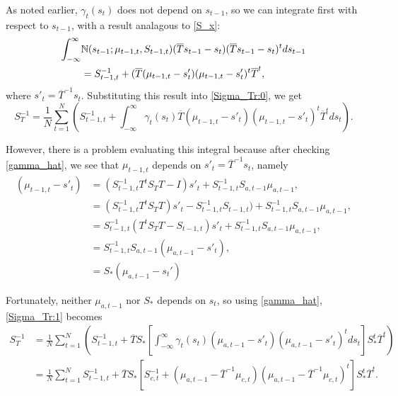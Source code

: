 \documentclass[12pt,leqno]{article}
\begin{document}
As noted earlier, $\gamma_t(s_t)$ does not depend on $s_{t-1}$, so we can integrate first with respect to $s_{t-1}$, with
a result analagous to \eqref{S_x}:
\begin{align*}
  \int_{-\infty}^{\infty}&{\mathbb N}(s_{t-1};\mu_{t-1,t},S_{t-1,t})(\overline{T}s_{t-1}-s_t)
  (\overline{T}s_{t-1}-s_t)^tds_{t-1}\\ &= S_{t-1,t}^{-1} +
(\overline{T}(\mu_{t-1,t}-s'_t)(\mu_{t-1,t}-s'_t)^t\overline{T}^t,
\end{align*}
where $s'_t = \overline{T}^{-1}s_t$.
Substituting this result into \eqref{Sigma_Tr:0}, we get
\begin{equation}\label{Sigma_Tr:1}
  S_T^{-1} =  \frac{1}{N}\sum_{t=1}^N\left(S_{t-1,t}^{-1} +\int_{-\infty}^{\infty}\gamma_t(s_t)
  \overline{T}(\mu_{t-1,t}-s'_t)(\mu_{t-1,t}-s'_t)^t\overline{T}^tds_t\right).
\end{equation}

However, there is a problem evaluating this integral because after checking \eqref{gamma_hat}, we see that $\mu_{t-1,t}$
depends on $s'_t = \overline{T}^{-1}s_t$, namely 
\begin{equation}\label{s-mu_1}
  \begin{split}
    \left(\mu_{t-1,t}-s'_t\right) &= (S_{t-1,t}^{-1}T^{t}S_TT - I)s'_t + S_{t-1,t}^{-1}S_{a,t-1}\mu_{a,t-1}, \\
    &= (S_{t-1,t}^{-1}T^{t}S_TT)s'_t - S_{t-1,t}^{-1}S_{t-1,t}) + S_{t-1,t}^{-1}S_{a,t-1}\mu_{a,t-1}, \\
    &= S_{t-1,t}^{-1}(T^{t}S_TT - S_{t-1,t} )s'_t + S_{t-1,t}^{-1}S_{a,t-1}\mu_{a,t-1}, \\
    &= S_{t-1,t}^{-1}S_{a,t-1}(\mu_{a,t-1}-s'_t),\\
    &= S_*(\mu_{a,t-1}-s_t')
  \end{split}
\end{equation}

Fortunately, neither $\mu_{a,t-1}$ nor $S_*$ depends on $s_t$,
so using \eqref{gamma_hat}, \eqref{Sigma_Tr:1} becomes
\begin{equation}\label{S_Tr:2}
  \begin{split}
  S_T^{-1} &=\frac{1}{N}\sum_{t=1}^N\left(S_{t-1,t}^{-1} + \overline{T}S_*
  \left[\int_{-\infty}^{\infty}\gamma_t(s_t)(\mu_{a,t-1}-s'_t)(\mu_{a,t-1}-s'_t)^tds_t\right]S_*^t\overline{T}^t\right)\\
   &=\frac{1}{N}\sum_{t=1}^NS_{t-1,t}^{-1} + \overline{T}S_*
           [S_{c,t}^{-1}+(\mu_{a,t-1}-\overline{T}^{-1}\mu_{c,t})(\mu_{a,t-1}-\overline{T}^{-1}\mu_{c,t})^t]
           S_*^t\overline{T}^t.
  \end{split}
\end{equation}
\newpage
\end{document}
